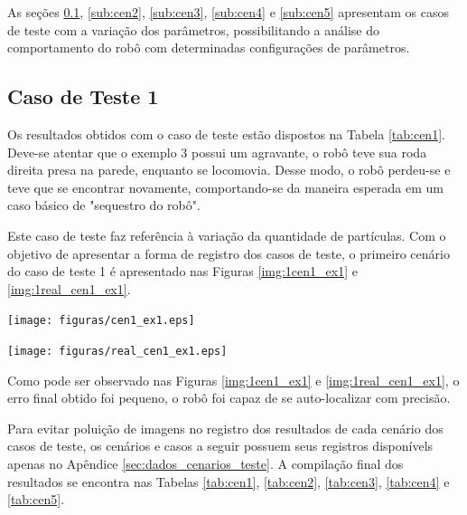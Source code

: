 As seções \ref{sub:cen1}, \ref{sub:cen2}, \ref{sub:cen3}, \ref{sub:cen4} e \ref{sub:cen5} apresentam os casos de teste com a variação dos parâmetros, possibilitando a análise do comportamento do robô
com determinadas configurações de parâmetros.

\subsection{Caso de Teste 1}
\label{sub:cen1}

Os resultados obtidos com o caso de teste estão dispostos na Tabela \ref{tab:cen1}. Deve-se atentar que o exemplo 3 possui um agravante, o
robô teve sua roda direita presa na parede, enquanto se locomovia. Desse modo, o robô perdeu-se e teve que se encontrar novamente, comportando-se
da maneira esperada em um caso básico de "sequestro do robô".

Este caso de teste faz referência à variação da quantidade de partículas. Com o objetivo de apresentar a forma de registro dos casos de teste,
o primeiro cenário do caso de teste 1 é apresentado nas Figuras \ref{img:1cen1_ex1} e \ref{img:1real_cen1_ex1}.

{\centering
\texttt{[image: figuras/cen1\_ex1.eps]}
\label{img:1cen1_ex1}
\par}

{\centering
\texttt{[image: figuras/real\_cen1\_ex1.eps]}
\label{img:1real_cen1_ex1}
\par}

Como pode ser observado nas Figuras \ref{img:1cen1_ex1} e \ref{img:1real_cen1_ex1}, o erro final obtido foi pequeno, o robô foi capaz
de se auto-localizar com precisão.

Para evitar poluição de imagens no registro dos resultados de cada cenário dos casos de teste, os cenários e casos a seguir
possuem seus registros disponívels apenas no Apêndice \ref{sec:dados_cenarios_teste}. A compilação final dos resultados se encontra nas Tabelas
\ref{tab:cen1}, \ref{tab:cen2}, \ref{tab:cen3}, \ref{tab:cen4} e \ref{tab:cen5}.


